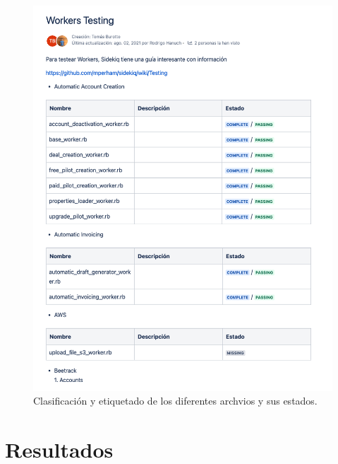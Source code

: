   \begin{figure}
    \centering
    \includegraphics[width=0.75\linewidth]{figures/testing/mapeo_tests_existentes.png}
    \caption{Clasificación y etiquetado de los diferentes archvios y sus estados.}
    \label{fig:mapeo_tests}
  \end{figure}

\section{Resultados}